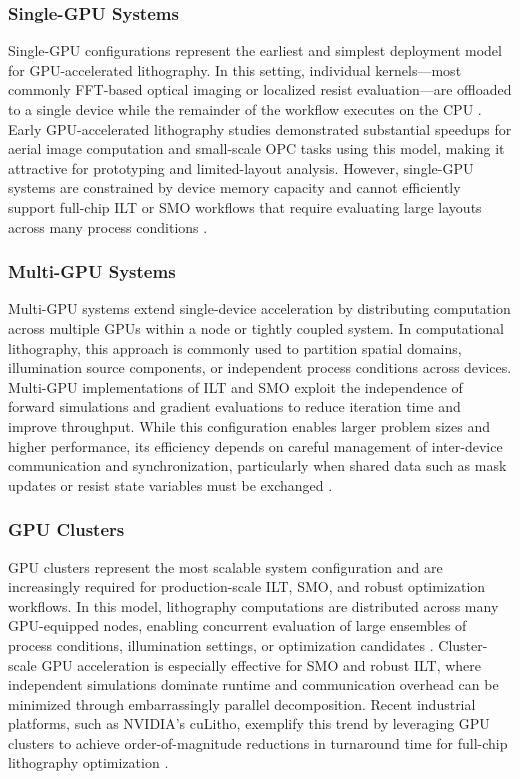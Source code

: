 \documentclass[pdflatex,sn-mathphys-num]{sn-jnl}%
\theoremstyle{thmstyleone}%
\theoremstyle{thmstyletwo}%
\theoremstyle{thmstylethree}%
\begin{document}
\subsubsection{Single-GPU Systems}
Single-GPU configurations represent the earliest and simplest deployment model for GPU-accelerated lithography. In this setting, individual kernels—most commonly FFT-based optical imaging or localized resist evaluation—are offloaded to a single device while the remainder of the workflow executes on the CPU \cite{ZHANG2015176}. Early GPU-accelerated lithography studies demonstrated substantial speedups for aerial image computation and small-scale OPC tasks using this model, making it attractive for prototyping and limited-layout analysis. However, single-GPU systems are constrained by device memory capacity and cannot efficiently support full-chip ILT or SMO workflows that require evaluating large layouts across many process conditions \cite{yang2024gpuacceleratedinverselithographyhigh}.


\subsubsection{Multi-GPU Systems}
Multi-GPU systems extend single-device acceleration by distributing computation across multiple GPUs within a node or tightly coupled system. In computational lithography, this approach is commonly used to partition spatial domains, illumination source components, or independent process conditions across devices. Multi-GPU implementations of ILT and SMO exploit the independence of forward simulations and gradient evaluations to reduce iteration time and improve throughput. While this configuration enables larger problem sizes and higher performance, its efficiency depends on careful management of inter-device communication and synchronization, particularly when shared data such as mask updates or resist state variables must be exchanged \cite{Zheng2023}.

\subsubsection{GPU Clusters}
GPU clusters represent the most scalable system configuration and are increasingly required for production-scale ILT, SMO, and robust optimization workflows. In this model, lithography computations are distributed across many GPU-equipped nodes, enabling concurrent evaluation of large ensembles of process conditions, illumination settings, or optimization candidates \cite{Zheng2023}. Cluster-scale GPU acceleration is especially effective for SMO and robust ILT, where independent simulations dominate runtime and communication overhead can be minimized through embarrassingly parallel decomposition. Recent industrial platforms, such as NVIDIA’s cuLitho, exemplify this trend by leveraging GPU clusters to achieve order-of-magnitude reductions in turnaround time for full-chip lithography optimization \cite{Singh}.
\end{document}
